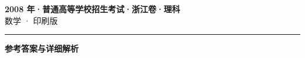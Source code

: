 \documentclass[zihao=5, a4paper]{ctexart}
\begin{document}
\begin{center}
  {\Large\bfseries 2008 年·普通高等学校招生考试·浙江卷·理科}\\[4pt]
  {\large 数学 · 印刷版}
\end{center}
\medskip
{}

\par\bigskip\hrule\bigskip
{}
\begin{center}{\large\bfseries 参考答案与详细解析}\end{center}
\smallskip

\end{document}
